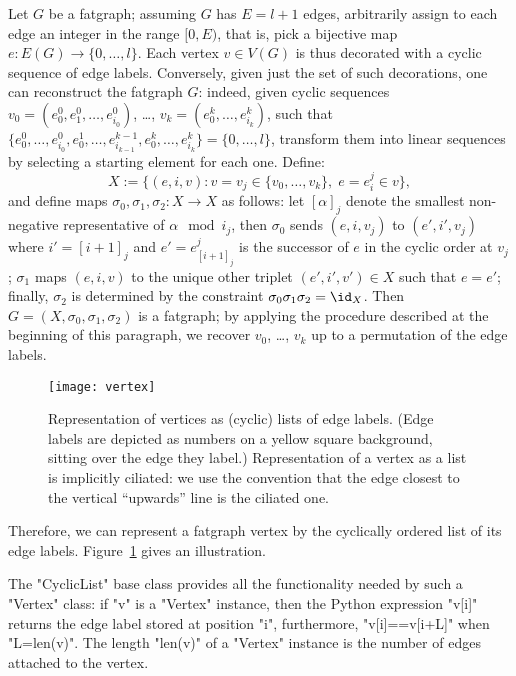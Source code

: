 Let $G$ be a fatgraph; assuming $G$ has $E = l+1$ edges, arbitrarily
assign to each edge an integer in the range $[0, E)$, that is, pick a
bijective map $e: E(G) \to \{0, \dots, l\}$.  Each vertex $v \in V(G)$
is thus decorated with a cyclic sequence of edge labels.  Conversely,
given just the set of such decorations, one can reconstruct the
fatgraph $G$: indeed, given cyclic sequences $v_0 = (e_0^0, e^0_1,
\ldots, e^0_{i_0})$, \ldots, $v_k = (e^k_0, \ldots, e^k_{i_k})$, such
that $\{e^0_0, \ldots, e^0_{i_0}, e^1_0, \ldots, e^{k-1}_{i_{k-1}},
e^k_0, \ldots, e^k_{i_k}\} = \{0, \ldots, l\}$, transform them into
linear sequences by selecting a starting element for each one.  Define:
\begin{equation*}
  X := \{ (e, i, v) : v = v_j \in \{v_0, \ldots, v_k\},\; 
                        e = e^j_i \in v \},
\end{equation*}
and define maps $\sigma_0, \sigma_1, \sigma_2: X \to X$ as follows:
let $[\alpha]_j$ denote the smallest non-negative representative of
$\alpha \mod i_j$, then $\sigma_0$ sends $(e, i, v_j)$ to $(e', i', v_j)$
where $i' = [i+1]_j$ and $e' = e^j_{[i+1]_j}$ is the successor
of $e$ in the cyclic order at $v_j$; $\sigma_1$ maps $(e, i, v)$ to the
unique other triplet $(e', i', v') \in X$ such that $e = e'$; finally,
$\sigma_2$ is determined by the constraint $\sigma_0\sigma_1\sigma_2 =
\id_X$.  Then $G = (X, \sigma_0, \sigma_1, \sigma_2)$ is a fatgraph;
by applying the procedure described at the beginning of this
paragraph, we recover $v_0$, \ldots, $v_k$ up to a permutation of the
edge labels.
\begin{figure}
  \centering
  \texttt{[image: vertex]}
  \caption{Representation of vertices as (cyclic) lists of edge
    labels.  (Edge labels are depicted as numbers on a yellow square
    background, sitting over the edge they label.)  Representation of
    a vertex as a list is implicitly ciliated: we use the convention
    that the edge closest to the vertical ``upwards'' line is the
    ciliated one.}
  \label{fig:vertex}
\end{figure}

Therefore, we can represent a fatgraph vertex by the cyclically
ordered list of its edge labels.  Figure~\ref{fig:vertex} gives an
illustration. 

The "CyclicList" base class provides all the functionality needed by
such a "Vertex" class: if "v" is a "Vertex" instance, then the
Python expression "v[i]" returns the edge label stored at
position "i", furthermore, "v[i]==v[i+L]" when "L=len(v)".
The length "len(v)" of a "Vertex" instance is the number of edges attached
to the vertex.  


